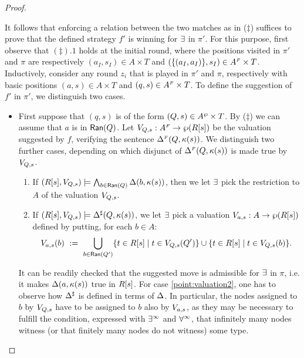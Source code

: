 \begin{proof}
\begin{enumerate}[(i)]
It follows that enforcing a relation between the two matches as in ($\ddag$) suffices to prove that the defined strategy $f'$ is winning for $\exists$ in $\pi'$. For this purpose, first observe that $(\ddag).1$ holds at the initial round, where the positions visited in $\pi'$ and $\pi$ are respectively $(a_I,s_I) \in A \times T$ and $(\{(a_I,a_I)\},s_I) \in A^{{\scriptscriptstyle F}} \times T$. Inductively, consider any round $z_i$ that is played in $\pi'$ and $\pi$, respectively with basic positions $(a,s) \in A \times T$ and $(q,s) \in A^{{\scriptscriptstyle F}} \times T$. To define the suggestion of $f'$ in $\pi'$, we distinguish two cases.
\begin{itemize}
  \item First suppose that $(q,s)$ is of the form $(Q,s) \in
  A^{\wp}\times T$. By ($\ddag$) we can assume that $a$ is in $\mathsf{Ran}(Q)$. Let $V_{Q,s} :A^{{\scriptscriptstyle F}} \rightarrow \wp(R[s])$ be the valuation suggested by $f$, verifying the sentence $\Delta^{{\scriptscriptstyle F}}(Q,\kappa(s))$. We distinguish two further cases, depending on which disjunct of $\Delta^{{\scriptscriptstyle F}}(Q,\kappa(s))$ is made true by $V_{Q,s}$.
      \begin{enumerate}[label=(\roman*), ref=\roman*]
        \item If $(R[s],V_{Q,s})\models \bigwedge_{b \in \mathsf{Ran}(Q)} \Delta(b,\kappa(s))$, then we let $\exists$ pick the restriction to $A$ of the valuation $V_{Q,s}$. \label{point:valuation1}
        \item If $(R[s],V_{Q,s})\models \Delta^{\sharp}(Q,\kappa(s))$, we let $\exists$ pick a valuation $V_{a,s}:A \rightarrow \wp (R[s])$ defined by putting, for each $b \in A$:
            \begin{align*}
               V_{a,s}(b)\ :=\ \bigcup_{b \in \mathsf{Ran}(Q')} \{t \in R[s] \mid t \in V_{Q,s}(Q')\} 
               \cup  \{t \in R[s] \mid t \in V_{Q,s}(b)\} .
            \end{align*} \label{point:valuation2}
      \end{enumerate}
      It can be readily checked that the suggested move is admissible for $\exists$ in $\pi$, i.e. it makes $\Delta(a,\kappa(s))$ true in $R[s]$. For case \eqref{point:valuation2}, one has to observe how $\Delta^{\sharp}$ is defined in terms of $\Delta$. In particular, the nodes assigned to $b$ by $V_{Q,s}$ have to be assigned to $b$ also by $V_{a,s}$, as they may be necessary to fulfill the condition, expressed with $\exists^\infty$ and $\forall^\infty$, that infinitely many nodes witness (or that finitely many nodes do not witness) some type.


\end{itemize}
\end{enumerate}
\end{proof}

